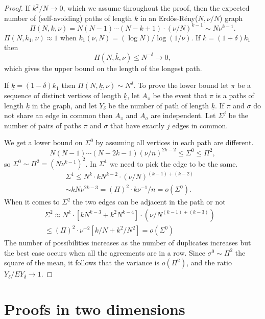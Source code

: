 \documentclass[11pt]{article}
\def\clearp{}
\theoremstyle{definition}
\begin{document}
\begin{proof}
If $k^2/N \to 0$, which we assume throughout the proof, then the expected number of (self-avoiding) paths of length $k$ in an Erd\"os-R\'eny($N,\nu/N$) graph
$$
\Pi(N,k,\nu) = N(N-1) \cdots (N-k+1) \cdot (\nu/N)^{k-1} \sim N \nu^{k-1} .
$$
$\Pi(N,k_1,\nu) \approx 1$ when $k_1(\nu,N)= (\log N)/\log (1/\nu)$. If $\bar k = (1+\delta)k_1$ then 
$$
\Pi(N,\bar k,\nu) \le N^{-\delta} \to 0 ,
$$
which gives the upper bound on the length of the longest path. 

If $\underline{k} = (1-\delta) k_1$ then $\Pi(N,\underline{k},\nu) \sim N^\delta$. To prove the lower bound let $\pi$ be a sequence of distinct vertices of length $\underline{k}$, let $A_\pi$ be the event that $\pi$ is a paths of length $\underline{k}$ in the graph, and let $Y_\delta$ be the number of path of length $\underline{k}$. If $\pi$ and $\sigma$ do not share an edge in common then $A_{\pi}$ and $A_\sigma$ are independent. Let $\Sigma^j$ be the number of pairs of paths $\pi$ and $\sigma$ that have exactly $j$ edges in common. 

We get a lower bound on $\Sigma^0$ by assuming all vertices in each path are different.
$$
N(N-1) \cdots (N-2k-1)  (\nu/n)^{2k-2} \le \Sigma^0  \le \Pi^2 ,
$$
so $\Sigma^0 \sim \Pi^2= (N \nu^{k-1})^2$. In $\Sigma^1$ we need to pick the edge to be the same.
\begin{align*}
\Sigma^1  \le N^k \cdot k N^{k-2} \cdot ( \nu/N)^{(k-1)+(k-2)}& \\
\sim kN\nu^{2k-3}= (\Pi)^2 \cdot k \nu^{-1}/n = o(\Sigma^0). &
\end{align*}
 When it comes to $\Sigma^2$ the two edges can be adjacent in the path or not
\begin{align*}
\Sigma^2 \approx N^k \cdot [k N^{k-3} + k^2 N^{k-4}] 
\cdot ( \nu/N^{(k-1)+(k-3)})& \\
\le (\Pi)^2 \cdot \nu^{-2}  [k/N+ k^2/N^2] = o(\Sigma^0)&
\end{align*}
The number of possibilities increases as the number of duplicates increases but the best case occurs when all the agreements are in a row. Since $\sigma^0 \sim \Pi^2$ the square of the mean, it follows that the variance is $o(\Pi^2)$, and the ratio $Y_\delta/EY_\delta \to 1$.
\end{proof}

\clearp

\section{Proofs in two dimensions} \label{sec:Pf2d}
\end{document}
